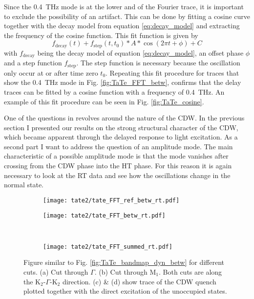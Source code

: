 Since the \qty{0.4}{\tera\hertz} mode is at the lower and of the Fourier trace, it is important to exclude the possibility of an artifact.
This can be done by fitting a cosine curve together with the decay model from equation \ref{eq:decay_model} and extracting the frequency of the cosine function.
This fit function is given by
\begin{equation}
	f_\text{decay}(t) + f_\text{step}(t, t_0) * A * \cos(2\pi t+\phi) + C
\end{equation}
with $f_\text{decay}$ being the decay model of equation \ref{eq:decay_model}, an offset phase $\phi$ and a step function $f_\text{step}$.
The step function is necessary because the oscillation only occur at or after time zero $t_0$.
Repeating this fit procedure for traces that show the \qty{0.4}{\tera\hertz} mode in Fig. \ref{fig:TaTe_FFT_betw}, confirms that the delay traces can be fitted by a cosine function with a frequency of \qty{0.4}{\tera\hertz}.
An example of this fit procedure can be seen in Fig. \ref{fig:TaTe_cosine}.

One of the questions in  revolves around the nature of the CDW.
In the previous section I presented our results on the strong structural character of the CDW, which became apparent through the delayed response to light excitation.
As a second part I want to address the question of an amplitude mode.
The main characteristic of a possible amplitude mode is that the mode vanishes after crossing from the CDW phase into the HT phase.
For this reason it is again necessary to look at the RT data and see how the oscillations change in the normal state.

\begin{figure}[b!]
	\centering
	\begin{subfigure}[b]{0.33\textwidth}
		\texttt{[image: tate2/tate\_FFT\_ref\_betw\_rt.pdf]}
		\caption{}
	\end{subfigure}
	\begin{subfigure}[b]{0.66\textwidth}
		\texttt{[image: tate2/tate\_FFT\_betw\_rt.pdf]}
		\caption{}
	\end{subfigure}
	\\
	\begin{subfigure}[b]{0.33\textwidth}
		\texttt{[image: tate2/tate\_FFT\_summed\_rt.pdf]}
		\caption{}
	\end{subfigure}
	\caption{Figure similar to Fig. \ref{fig:TaTe_bandmap_dyn_betw} for different cuts. (a) Cut through $\Gamma$. (b) Cut through M$_1$. Both cuts are along the K$_2$-$\Gamma$-K$_2$ direction. (c) \& (d) show trace of the CDW quench plotted together with the direct excitation of the unoccupied states.}
	\label{fig:TaTe_FFT_betw_rt}
\end{figure}

